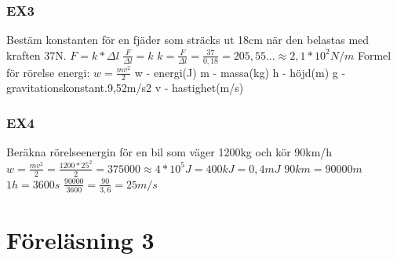 \documentclass[a4paper,10pt]{article}
\begin{document}
\begin{flushleft}
  \subsubsection{EX3}
    Bestäm konstanten för en fjäder  som sträcks ut 18cm när den belastas med kraften 37N.\newline
    $ F=k*\Delta l $\newline
    $ \frac{F}{\Delta l} = k $\newline
    $ k = \frac{F}{\Delta l} = \frac{37}{0,18} = 205,55... \approx 2,1*10^2 N/m $\newline
    Formel för rörelse energi: $ w = \frac{mv^2}{2} $\newline
    w - energi(J)\newline
    m - massa(kg)\newline
    h - höjd(m)\newline
    g - gravitationskonstant.9,52m/s2\newline
    v - hastighet(m/s)\newline
  \subsubsection{EX4}
    Beräkna rörelseenergin för en bil som väger 1200kg och kör 90km/h\newline
    $ w = \frac{mv^2}{2} = \frac{1200*25^2}{2} = 375000 \approx 4*10^5 J = 400 kJ = 0,4 mJ $\newline
    $ 90km = 90000m $\newline
    $ 1h = 3600s $\newline
    $ \frac{90000}{3600} = \frac{90}{3,6} = 25m/s $\newline
  \newpage
  \section{Föreläsning 3}

\end{flushleft}
\end{document}
